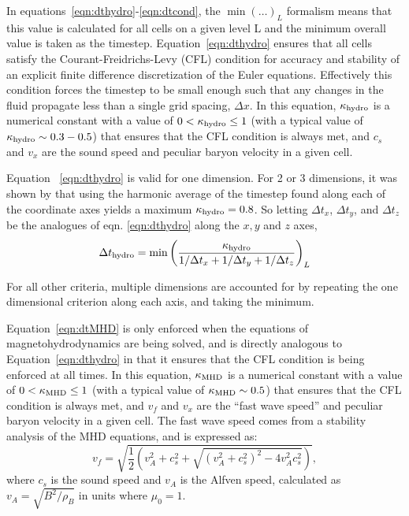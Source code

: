 
In equations~\ref{eqn:dthydro}-\ref{eqn:dtcond}, the $\min ( \ldots
)_L$ formalism means that this value is calculated for all cells on a
given level L and the minimum overall value is taken as the timestep.
Equation~\ref{eqn:dthydro} ensures that all cells satisfy the
Courant-Freidrichs-Levy (CFL) condition for accuracy and stability of
an explicit finite difference discretization of the Euler equations.
Effectively this condition forces the timestep to be small enough such
that any changes in the fluid propagate less than a single grid
spacing, $\Delta x$.  In this equation, $\kappa_{\rm hydro}$ is a
numerical constant with a value of $0 < \kappa_{\rm hydro} \leq 1$
(with a typical value of $\kappa_{\rm hydro} \sim 0.3-0.5$) that
ensures that the CFL condition is always met, and $c_s$ and $v_x$ are
the sound speed and peculiar baryon velocity in a given cell.

Equation ~\ref{eqn:dthydro} is valid for one dimension.  For 2 or 3
dimensions, it was shown by \cite{Godunov1959}  that using the
harmonic average of the timestep found along each of the coordinate
axes yields a maximum $\kappa_{\rm hydro} = 0.8$.  So letting $\Delta
t_x$, $\Delta t_y$, and $\Delta t_z$ be the analogues of
eqn. \ref{eqn:dthydro} along the $x,y$ and $z$ axes, 
\begin{equation}
  \Delta t_{\rm hydro} = \min \left( \frac{\kappa_{\rm hydro}} {1/\Delta t_x
  +1/\Delta t_y + 1/\Delta t_z} \right)_L
\end{equation}

For all other criteria, multiple dimensions are accounted for by
repeating the one dimensional criterion along each axis, and taking
the minimum.

Equation~\ref{eqn:dtMHD} is only enforced when the equations of
magnetohydrodynamics are being solved, and is directly analogous to
Equation~\ref{eqn:dthydro} in that it ensures that the CFL condition
is being enforced at all times.  In this equation, $\kappa_{\rm MHD}$ is a
numerical constant with a value of $0 < \kappa_{\rm MHD} \leq 1$ (with a
typical value of $\kappa_{\rm MHD} \sim 0.5$) that ensures that the CFL
condition is always met, and $v_f$ and $v_x$ are the ``fast wave
speed'' and peculiar baryon velocity in a given cell.  The fast wave
speed comes from a stability analysis of the MHD equations, and is
expressed as:
%
\begin{equation}
v_f = \sqrt{ \frac{1}{2} \left(  v_A^2 + c_s^2 + \sqrt{(v_A^2 +
      c_s^2)^2 - 4 v_A^2 c_s^2}  \right)  },
\label{eqn:vfastmhd}
\end{equation}
%
where $c_s$ is the sound speed and $v_A$ is the Alfven speed, calculated
as $v_A = \sqrt{B^2/\rho_B}$ in units where $\mu_0 = 1$.

